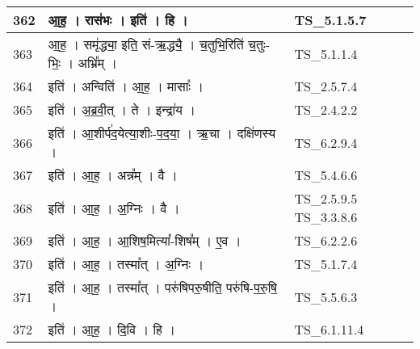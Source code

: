\documentclass[17pt]{extarticle}
\begin{document}
\begin{longtable}{||p{0.4in}||p{4.9in}||p{0.9in}||}
    \hline
        
    362 & आ॒ह॒   ।   रास॑भः   ।   इति॑   ।   हि   ।    & TS\_5.1.5.7       \\
    
    \hline
        
    363 & आ॒ह॒   ।   समृ॑द्ध्या॒ इति॒ सं{-}ऋ॒द्ध्यै॒   ।   च॒तुभि॒रिति॑ च॒तुः{-}भिः॒   ।   अभ्रि᳚म्   ।    & TS\_5.1.1.4       \\
    
    \hline
        
    364 & इति॑   ।   अन्विति॑   ।   आ॒ह॒   ।   मासाः᳚   ।    & TS\_2.5.7.4       \\
    
    \hline
        
    365 & इति॑   ।   अ॒ब्र॒वी॒त्   ।   ते   ।   इन्द्रा॑य   ।    & TS\_2.4.2.2       \\
    
    \hline
        
    366 & इति॑   ।   आ॒शीर्प॑द॒येत्या॒शीः{-}प॒द॒या॒   ।   ऋ॒चा   ।   दक्षि॑णस्य   ।    & TS\_6.2.9.4       \\
    
    \hline
        
    367 & इति॑   ।   आ॒ह॒   ।   अन्न᳚म्   ।   वै   ।    & TS\_5.4.6.6       \\
    
    \hline
        
    368 & इति॑   ।   आ॒ह॒   ।   अ॒ग्निः   ।   वै   ।    & TS\_2.5.9.5 TS\_3.3.8.6       \\
    
    \hline
        
    369 & इति॑   ।   आ॒ह॒   ।   आ॒शिष॒मित्या᳚{-}शिष᳚म्   ।   ए॒व   ।    & TS\_6.2.2.6       \\
    
    \hline
        
    370 & इति॑   ।   आ॒ह॒   ।   तस्मा᳚त्   ।   अ॒ग्निः   ।    & TS\_5.1.7.4       \\
    
    \hline
        
    371 & इति॑   ।   आ॒ह॒   ।   तस्मा᳚त्   ।   परु॑षिपरु॒षीति॒ परु॑षि{-}प॒रु॒षि॒   ।    & TS\_5.5.6.3       \\
    
    \hline
        
    372 & इति॑   ।   आ॒ह॒   ।   दि॒वि   ।   हि   ।    & TS\_6.1.11.4       \\
    

\end{longtable}
\end{document}
